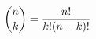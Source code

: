\documentclass[preview]{standalone}
\begin{document}
\begin{align*}
\special{dvisvgm:raw <g id='unique000'>}\binom{n}{k} = \frac{n!}{k!(n-k)!}\special{dvisvgm:raw </g>}
\end{align*}
\end{document}
